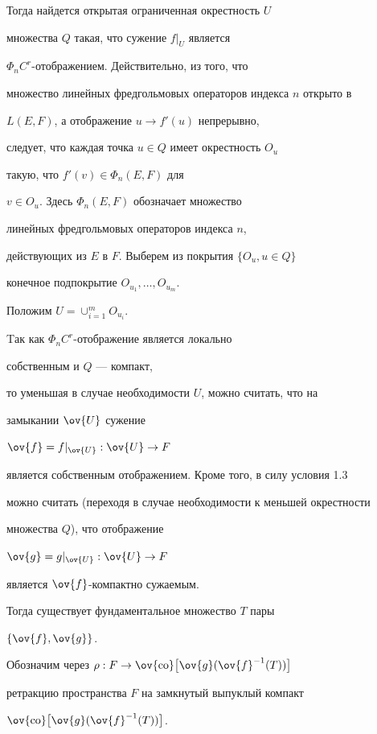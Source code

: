 Тогда найдется открытая ограниченная окрестность $U$


множества $Q$ такая, что сужение $f|_U$ является


$\Phi_n C^r$-отображением. Действительно, из того, что


множество линейных фредгольмовых операторов индекса $n$ открыто в


$L(E, F)$, а отображение $u \to f' (u)$ непрерывно,


следует, что каждая точка $u \in Q$ имеет окрестность $O_u$ 


такую, что $f' (v) \in \Phi_n (E, F)$ для


$v\in O_u$. Здесь $\Phi_n (E, F)$ обозначает множество


линейных фредгольмовых операторов индекса $n$, 


действующих из $E$ в $F$. Выберем из покрытия $\{O_u, u\in Q\}$ 


конечное подпокрытие $O_{u_1}, \dotsc, O_{u_m}$.


Положим $U=\cup_{i=1}^m O_{u_i}$.





Tак как $\Phi_n C^r $-отображение является локально 


собственным \cite{1} и $Q$ --- компакт, 


то уменьшая в случае необходимости $U$, можно считать, что на 


замыкании $\ov {U}$ сужение


$\ov {f} = f|_{\ov {U}} : \ov {U}\to F$


является собственным отображением. Кроме того, в силу условия 1.3


можно считать (переходя в случае необходимости к меньшей окрестности


множества $Q$), что отображение 


$\ov {g} = g|_{\ov {U}} : \ov {U}\to F$


является $\ov {f}$-компактно сужаемым.


Тогда существует фундаментальное множество $T$ пары 


$\{\ov{f}, \ov{g} \}$.


Обозначим через $\rho : F \to \ov {\co} 


\bigl[\ov{g} (\ov{f}^{-1}(T)) \bigr]$


ретракцию пространства $F$ на замкнутый выпуклый компакт 


$\ov {\co} 


\bigl[\ov{g} (\ov{f}^{-1}(T)) \bigr]$.


